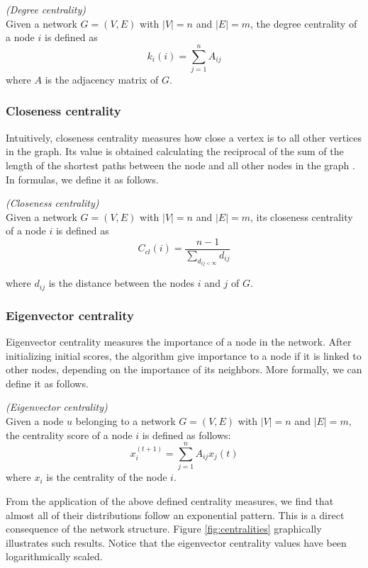 \documentclass[sigchi]{acmart}
\begin{document}
\begin{definition}
\textit{(Degree centrality)} \\
Given a network $G=(V, E)$ with $|V| = n$ and $|E| = m$, the degree centrality of a node $i$ is defined as
$$ k_i(i) = \sum_{j = 1}^{n} A_{ij}$$
where $A$ is the adjacency matrix of $G$.
\end{definition}

\subsubsection{Closeness centrality}
Intuitively, closeness centrality measures how close a vertex is to all other vertices in the graph. Its value is obtained calculating the reciprocal of the sum of the length of the shortest paths between the node and all other nodes in the graph \cite{closeness}. In formulas, we define it as follows.

\begin{definition}
\textit{(Closeness centrality)} \\
Given a network $G=(V, E)$ with $|V| = n$ and $|E| = m$, its closeness centrality of a node $i$ is defined as 
\begin{equation}
    C_{cl}(i) = \frac{n-1}{\sum_{d_{ij < \infty}} d_{ij}}     
\end{equation}

where $d_{ij}$ is the distance between the nodes $i$ and $j$ of $G$.
\end{definition}

\subsubsection{Eigenvector centrality}
Eigenvector centrality measures the importance of a node in the network. After initializing initial scores, the algorithm give importance to a node if it is linked to other nodes, depending on the importance of its neighbors. More formally, we can define it as follows.

\begin{definition}
\textit{(Eigenvector centrality)} \\
Given a node $u$ belonging to a network $G=(V, E)$ with $|V| = n$ and $|E| = m$, the centrality score of a node $i$ is defined as follows: 
$$ x_{i}^{(t+1)}= \sum_{j=1}^{n} A_{ij}x_{j}{(t)}$$
where $x_{i}$ is the centrality of the node $i$.
\end{definition}

From the application of the above defined centrality measures, we find that almost all of their distributions follow an exponential pattern. This is a direct consequence of the network structure. Figure \ref{fig:centralities} graphically illustrates such results. Notice that the eigenvector centrality values have been logarithmically scaled.
\end{document}
